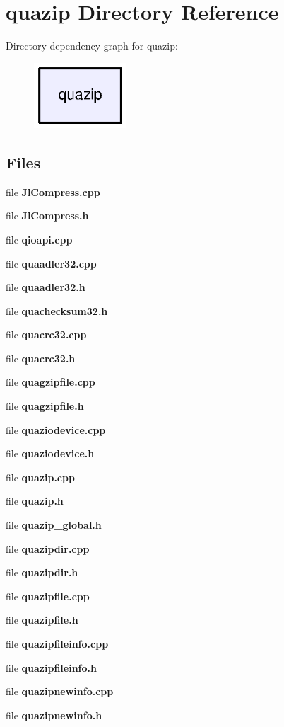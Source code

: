 \section{quazip Directory Reference}
\label{dir_94f3fdea1a650ed21d35813cdb37a339}
Directory dependency graph for quazip\-:
\nopagebreak
\begin{figure}[H]
\begin{center}
\leavevmode
\includegraphics[width=98pt]{dir_94f3fdea1a650ed21d35813cdb37a339_dep}
\end{center}
\end{figure}
\subsection*{Files}
\begin{DoxyCompactItemize}
\item 
file {\bfseries Jl\-Compress.\-cpp}
\item 
file {\bfseries Jl\-Compress.\-h}
\item 
file {\bfseries qioapi.\-cpp}
\item 
file {\bfseries quaadler32.\-cpp}
\item 
file {\bfseries quaadler32.\-h}
\item 
file {\bfseries quachecksum32.\-h}
\item 
file {\bfseries quacrc32.\-cpp}
\item 
file {\bfseries quacrc32.\-h}
\item 
file {\bfseries quagzipfile.\-cpp}
\item 
file {\bfseries quagzipfile.\-h}
\item 
file {\bfseries quaziodevice.\-cpp}
\item 
file {\bfseries quaziodevice.\-h}
\item 
file {\bfseries quazip.\-cpp}
\item 
file {\bfseries quazip.\-h}
\item 
file {\bfseries quazip\-\_\-global.\-h}
\item 
file {\bfseries quazipdir.\-cpp}
\item 
file {\bfseries quazipdir.\-h}
\item 
file {\bfseries quazipfile.\-cpp}
\item 
file {\bfseries quazipfile.\-h}
\item 
file {\bfseries quazipfileinfo.\-cpp}
\item 
file {\bfseries quazipfileinfo.\-h}
\item 
file {\bfseries quazipnewinfo.\-cpp}
\item 
file {\bfseries quazipnewinfo.\-h}
\end{DoxyCompactItemize}

